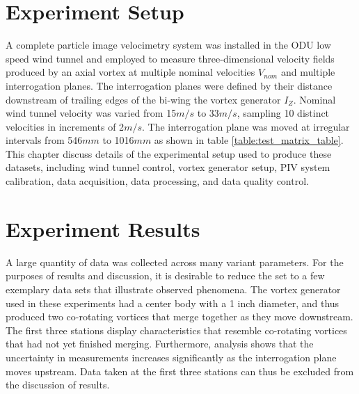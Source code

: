 \documentclass[12pt]{report}
\begin{document}



\chapter{Experiment Setup}
A complete particle image velocimetry system was installed in the ODU low speed 
wind tunnel and employed to measure three-dimensional velocity fields produced 
by an axial vortex at multiple nominal velocities $V_{nom}$ and multiple 
interrogation planes. The interrogation planes were defined by their 
distance downstream of trailing edges of the bi-wing the vortex generator 
$I_Z$. Nominal wind tunnel velocity was varied from 15$m/s$ to 33$m/s$, 
sampling 10 distinct velocities in increments of 2$m/s$. The interrogation 
plane was moved at irregular intervals from 546$mm$ to 1016$mm$ as shown in 
table \ref{table:test_matrix_table}. This chapter discuss details of the 
experimental setup used to produce these datasets, including wind tunnel 
control, vortex generator setup, PIV system calibration, data acquisition, data 
processing, and data quality control.









\chapter{Experiment Results}

A large quantity of data was collected across many variant parameters. For the 
purposes of results and discussion, it is desirable to reduce the set to a few 
exemplary data sets that illustrate observed phenomena. The vortex generator 
used in these experiments had a center body with a 1 inch diameter, and thus 
produced two co-rotating vortices that merge together as they move downstream. 
The first three stations display characteristics that resemble co-rotating 
vortices that had not yet finished merging. Furthermore, analysis shows that 
the uncertainty in measurements increases significantly as the interrogation 
plane moves upstream. Data taken at the first three stations can thus be 
excluded from the discussion of results.
\end{document}
